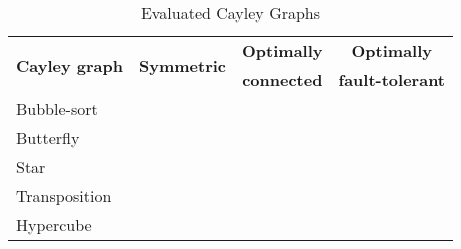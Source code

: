 \begin{table}
    \begin{tabular}{l c c c}
      \toprule
      \multirow{2}{*}{\textbf{Cayley graph}}&\multirow{2}{*}{\textbf{Symmetric}}&\textbf{Optimally}&\textbf{Optimally}\\
      &&\textbf{connected}&\textbf{fault-tolerant}\\
      \midrule
      Bubble-sort & \multirow{2}{*}{\centering{No}}&\multirow{2}{*}{\centering{No}}&\multirow{2}{*}{\centering{No}}\\
      Butterfly & \\
      \hline
      Star & \multirow{3}{*}{\centering{Yes}}& \multirow{3}{*}{\centering{Yes}}& \multirow{3}{*}{\centering{Yes}}\\
      Transposition & \\
      Hypercube & \\
      \bottomrule
    \end{tabular}
    \caption{Evaluated Cayley Graphs}
  \end{table}
  